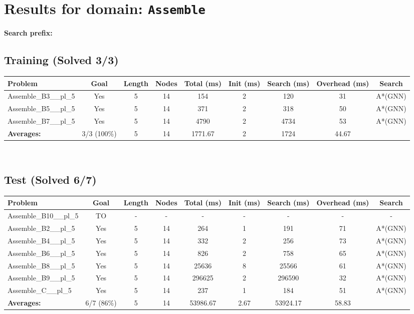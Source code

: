 \documentclass{article}
\begin{document}
\section*{Results for domain: \texttt{Assemble}}
\textbf{Search prefix:} 
\\[0.5cm]
\subsection*{Training (Solved 3/3)}
\begin{tabular}{lcccccccc}
\toprule
Problem & Goal & Length & Nodes & Total (ms) & Init (ms) & Search (ms) & Overhead (ms) & Search \\
\midrule
Assemble\_B3\_\_pl\_5 & Yes & 5 & 14 & 154 & 2 & 120 & 31 & A*(GNN) \\
Assemble\_B5\_\_pl\_5 & Yes & 5 & 14 & 371 & 2 & 318 & 50 & A*(GNN) \\
Assemble\_B7\_\_pl\_5 & Yes & 5 & 14 & 4790 & 2 & 4734 & 53 & A*(GNN) \\
\textbf{Averages:} & 3/3 (100\%) & 5 & 14 & 1771.67 & 2 & 1724 & 44.67 & \\
\bottomrule
\end{tabular}
\\[0.7cm]
\subsection*{Test (Solved 6/7)}
\begin{tabular}{lcccccccc}
\toprule
Problem & Goal & Length & Nodes & Total (ms) & Init (ms) & Search (ms) & Overhead (ms) & Search \\
\midrule
Assemble\_B10\_\_pl\_5 & TO & - & - & - & - & - & - & - \\
Assemble\_B2\_\_pl\_5 & Yes & 5 & 14 & 264 & 1 & 191 & 71 & A*(GNN) \\
Assemble\_B4\_\_pl\_5 & Yes & 5 & 14 & 332 & 2 & 256 & 73 & A*(GNN) \\
Assemble\_B6\_\_pl\_5 & Yes & 5 & 14 & 826 & 2 & 758 & 65 & A*(GNN) \\
Assemble\_B8\_\_pl\_5 & Yes & 5 & 14 & 25636 & 8 & 25566 & 61 & A*(GNN) \\
Assemble\_B9\_\_pl\_5 & Yes & 5 & 14 & 296625 & 2 & 296590 & 32 & A*(GNN) \\
Assemble\_C\_\_pl\_5 & Yes & 5 & 14 & 237 & 1 & 184 & 51 & A*(GNN) \\
\textbf{Averages:} & 6/7 (86\%) & 5 & 14 & 53986.67 & 2.67 & 53924.17 & 58.83 & \\
\bottomrule
\end{tabular}
\\[0.7cm]
\end{document}
